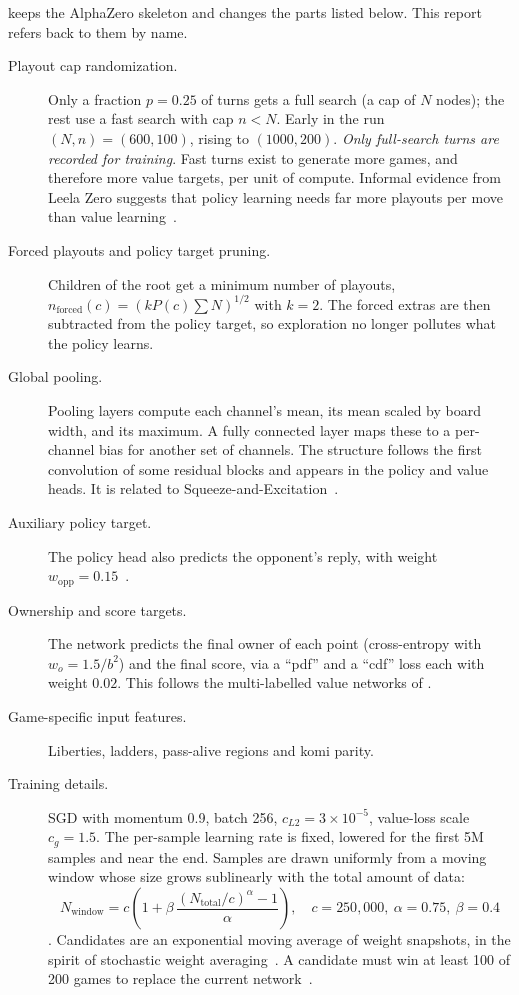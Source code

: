 \citet{wu2019accelerating} keeps the AlphaZero skeleton and changes the parts listed
below. This report refers back to them by name.
\begin{description}
  \item[Playout cap randomization.] Only a fraction $p=0.25$ of turns gets a full search
    (a cap of $N$ nodes); the rest use a fast search with cap $n<N$. Early in the run
    $(N,n)=(600,100)$, rising to $(1000,200)$. \emph{Only full-search turns are recorded
    for training}. Fast turns exist to generate more games, and therefore more value
    targets, per unit of compute. Informal evidence from Leela Zero suggests that policy
    learning needs far more playouts per move than value learning~\citep{forsten2019optimal}.
  \item[Forced playouts and policy target pruning.] Children of the root get a minimum
    number of playouts, $n_{\mathrm{forced}}(c)=(k P(c)\sum N)^{1/2}$ with $k=2$. The
    forced extras are then subtracted from the policy target, so exploration no longer
    pollutes what the policy learns.
  \item[Global pooling.] Pooling layers compute each channel's mean, its mean scaled by board
    width, and its maximum. A fully connected layer maps these to a per-channel bias for
    another set of channels. The structure follows the first convolution of some residual
    blocks and appears in the policy and value heads. It is related to
    Squeeze-and-Excitation~\citep{hu2018squeeze}.
  \item[Auxiliary policy target.] The policy head also predicts the opponent's reply, with
    weight $w_{\mathrm{opp}}=0.15$~\citep{tian2016better}.
  \item[Ownership and score targets.] The network predicts the final owner of each point
    (cross-entropy with $w_o = 1.5/b^2$) and the final score, via a ``pdf'' and a ``cdf''
    loss each with weight $0.02$. This follows the multi-labelled value networks of
    \citet{wu2018multilabelled}.
  \item[Game-specific input features.] Liberties, ladders, pass-alive regions and komi
    parity.
  \item[Training details.] SGD with momentum 0.9, batch 256, $c_{L2}=3\times10^{-5}$,
    value-loss scale $c_g=1.5$. The per-sample learning rate is fixed, lowered for the
    first 5M samples and near the end. Samples are drawn uniformly from a moving window
    whose size grows sublinearly with the total amount of data:
    \begin{equation}
      N_{\mathrm{window}} = c\left(1 + \beta\,\frac{(N_{\mathrm{total}}/c)^{\alpha} - 1}{\alpha}\right),
      \quad c=250{,}000,\ \alpha=0.75,\ \beta=0.4
      \label{eq:window}
    \end{equation}
    \citep[App.~C]{wu2019accelerating}. Candidates are an exponential moving average of
    weight snapshots, in the spirit of stochastic weight
    averaging~\citep{izmailov2018averaging}. A candidate must win at least 100 of 200 games
    to replace the current network~\citep[App.~E]{wu2019accelerating}.
\end{description}

